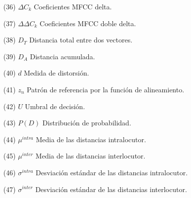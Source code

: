 \begin{enumerate}
\item[(36)] $\Delta C_{k}$ \hspace*{0.8cm} Coeficientes MFCC delta.
\item[(37)] $\Delta \Delta C_{k}$ \hspace*{0.45cm} Coeficientes MFCC doble delta.
\item[(38)] $D_{T}$ \hspace*{1.05cm} Distancia total entre dos vectores.
\item[(39)] $D_{A}$ \hspace*{1.05cm} Distancia acumulada.
\item[(40)] $d$ \hspace*{1.35cm} Medida de distorsión.
\item[(41)] $z_{n}$ \hspace*{1.2cm} Patrón de referencia por la función de alineamiento.
\item[(42)] $U$ \hspace*{1.3cm} Umbral de decisión.
\item[(43)] $P(D)$ \hspace*{0.65cm} Distribución de probabilidad.
\item[(44)] $\mu^{intra}$ \hspace*{0.7cm} Media de las distancias intralocutor.
\item[(45)] $\mu^{inter}$ \hspace*{0.7cm} Media de las distancias interlocutor.
\item[(46)] $\sigma^{intra}$ \hspace*{0.7cm} Desviación estándar de las distancias intralocutor.
\item[(47)] $\sigma^{inter}$ \hspace*{0.7cm} Desviación estándar de las distancias interlocutor.
\end{enumerate}

